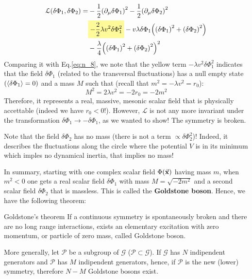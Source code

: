 \documentclass[../main/main.tex]{subfiles}
\begin{document}
\begin{equation}
\begin{split}
\mathcal{L} \qty(\delta \Phi _1, \delta \Phi _2)   = &  - \frac{1}{2} \qty(\partial_ \mu  \delta \Phi _1 )^2 - \frac{1}{2} \qty(\partial_ \mu \delta \Phi _2 )^2   \\
& \mathcolorbox{yellow!40}{- \frac{2}{2} \lambda v^2 \delta \Phi _1^2} - v \lambda \delta \Phi _1 \qty( \qty(\delta \Phi _1)^2 + \qty(\delta \Phi _2 )^2  ) \\
& - \frac{\lambda }{4} \qty( \qty(\delta \Phi _1)^2 + \qty(\delta \Phi _2)^2  )^2
\end{split}
\end{equation}
Comparing it with Eq.\eqref{eq:n_8}, we note that the yellow term \( - \lambda v^2 \delta \Phi _1^2 \) indicates that the field \( \delta \Phi _1 \) (related to the transversal fluctuations) has a null empty state \( ( \expval{\delta \Phi _1}= 0 ) \) and a mass \( M \) such that (recall that \( m^2 = - \lambda v^2 = r_0 \)):
\begin{equation*}
  M^2 = 2 \lambda v^2 =  -2 r_0 = - 2m^2
\end{equation*}
Therefore, it represents a real, massive, mesonic scalar field that is physically accettable (indeed we have \( r_0<0 \)!).
However, \( \mathcal{L} \) is not any more invariant under the transformation \( \delta \Phi _1 \rightarrow - \delta \Phi _1 \), as we wanted to show! The symmetry is broken.


\begin{remark}
  Note that the field \( \delta \Phi _2 \) has no mass (there is not a term \( \propto \delta \Phi _2^2 \))! Indeed, it describes the fluctuations along the circle where the potential \( V \) is in its minimum  which imples no dynamical inertia, that implies no mass!
\end{remark}

In summary, starting with one complex scalar field \( \Phi (\va{x}) \) having mass \( m \), when \( m^2 < 0 \) one gets a real scalar field \( \delta \Phi _1 \) with mass \( M = \sqrt{- 2 m^2}  \)  and a second scalar field \( \delta \Phi _2 \) that is massless. This is called the \textbf{Goldstone boson}. Hence, we have the following theorem:

\begin{theorem}{Goldstone's theorem}{}
If a continuous symmetry is spontaneously broken and there are no long range interactions, exists an elementary excitation with zero momentum, or particle of zero mass, called Goldstone boson.

More generally, let \( \mathcal{P} \) be a subgroup of \( \mathcal{G} \) (\( \mathcal{P} \subset \mathcal{G} \)). If \( \mathcal{G} \) has \( N \) indipendent generators and \( \mathcal{P} \)  has \( M \) indipendent generators, hence, if \( \mathcal{P} \) is the new (lower) symmetry, therefore \( N-M \)  Goldstone bosons exist.
\end{theorem}
\end{document}
